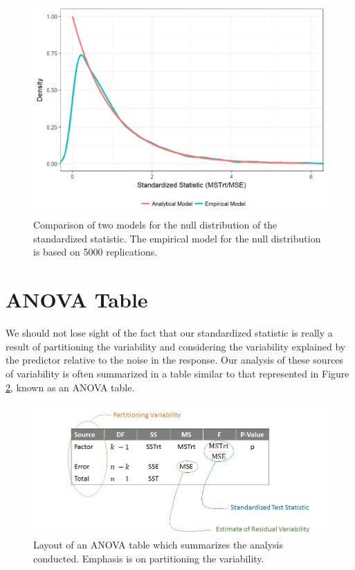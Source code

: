 \documentclass[]{book}
\theoremstyle{plain}
\theoremstyle{mydefn}
\theoremstyle{myexmpl}
\theoremstyle{remark}
\begin{document}
\begin{figure}

{\centering \includegraphics[width=0.8\linewidth]{./Images/anovateststat-compare-nulls-1} 

}

\caption{Comparison of two models for the null distribution of the standardized statistic.  The empirical model for the null distribution is based on 5000 replications.}\label{fig:anovateststat-compare-nulls}
\end{figure}

\section{ANOVA Table}\label{anova-table}

We should not lose sight of the fact that our standardized statistic is
really a result of partitioning the variability and considering the
variability explained by the predictor relative to the noise in the
response. Our analysis of these sources of variability is often
summarized in a table similar to that represented in Figure
\ref{fig:anovateststat-ANOVA-Table}, known as an ANOVA table.

\begin{figure}

{\centering \includegraphics[width=0.8\linewidth]{./images/ANOVAteststat-Table} 

}

\caption{Layout of an ANOVA table which summarizes the analysis conducted.  Emphasis is on partitioning the variability.}\label{fig:anovateststat-ANOVA-Table}
\end{figure}
\end{document}
